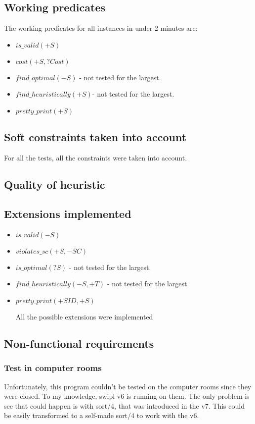 \documentclass[a4paper]{article}
\begin{document}
\subsection{Working predicates}
The working predicates for all instances in under 2 minutes are:
\begin{itemize}
\item $is\_valid(+S)$
\item $cost(+S, ?Cost)$
\item $find\_optimal(-S)$ - not tested for the largest.
\item $find\_heuristically(+S)$- not tested for the largest.
\item $pretty\_print(+S)$

\end{itemize}

\subsection{Soft constraints taken into account}
For all the tests, all the constraints were taken into account.

\subsection{Quality of heuristic}
\todo

\subsection{Extensions implemented}
\begin{itemize}
\item $is\_valid(-S)$
\item $violates\_sc(+S, -SC)$
\item $is\_optimal(?S)$ - not tested for the largest.
\item $find\_heuristically(-S, +T)$ - not tested for the largest.
\item $pretty\_print(+SID, +S)$

All the possible extensions were implemented
\end{itemize}
\subsection{Non-functional requirements}
\subsubsection{Test in computer rooms}\label{test}
Unfortunately, this program couldn't be tested on the computer rooms since they were closed. To my knowledge, swipl v6 is running on them. The only problem is see that could happen is with sort/4, that was introduced in the v7. This could be easily transformed to a self-made sort/4 to work with the v6.
\end{document}
